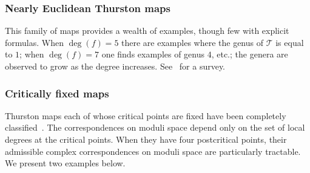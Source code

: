 \documentclass{amsart}
\theoremstyle{definition}
\theoremstyle{remark}
\newcommand{\cT}{\mathcal{T}}
\begin{document}
\subsubsection*{Nearly Euclidean Thurston maps}  This family of maps provides a wealth of examples, though few with explicit formulas. When $\deg(f)=5$ there are examples where the genus of $\cT$ is equal to $1$; when $\deg(f)=7$ one finds examples of genus $4$, etc.; the genera are observed to grow as the degree increases. See~\cite{kmp:origami} for a survey.  

\subsubsection*{Critically fixed maps} Thurston maps each of whose critical points are fixed have been completely classified~\cites{kmp:fixed, Hlushchanka:2022aa, Hlushchanka:2019aa}. The correspondences on moduli space depend only on the set of local degrees at the critical points.  When they have four postcritical points, their admissible complex correspondences on moduli space are particularly tractable. We present two examples below. 
\end{document}
